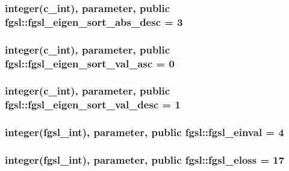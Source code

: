 \subsubsection[{fgsl\+\_\+eigen\+\_\+sort\+\_\+abs\+\_\+desc}]{\setlength{\rightskip}{0pt plus 5cm}integer(c\+\_\+int), parameter, public fgsl\+::fgsl\+\_\+eigen\+\_\+sort\+\_\+abs\+\_\+desc = 3}\label{namespacefgsl_a0ed0d4f25aa5ae03cb6adfe004cf648e}
\hypertarget{namespacefgsl_ad37ba047f5c1bbd5e2621f94d81a5aa4}{}
\subsubsection[{fgsl\+\_\+eigen\+\_\+sort\+\_\+val\+\_\+asc}]{\setlength{\rightskip}{0pt plus 5cm}integer(c\+\_\+int), parameter, public fgsl\+::fgsl\+\_\+eigen\+\_\+sort\+\_\+val\+\_\+asc = 0}\label{namespacefgsl_ad37ba047f5c1bbd5e2621f94d81a5aa4}
\hypertarget{namespacefgsl_a2dac34cd764be6e7de1f57d061c7f5d2}{}
\subsubsection[{fgsl\+\_\+eigen\+\_\+sort\+\_\+val\+\_\+desc}]{\setlength{\rightskip}{0pt plus 5cm}integer(c\+\_\+int), parameter, public fgsl\+::fgsl\+\_\+eigen\+\_\+sort\+\_\+val\+\_\+desc = 1}\label{namespacefgsl_a2dac34cd764be6e7de1f57d061c7f5d2}
\hypertarget{namespacefgsl_a720540845b1b10b1af117475a2b5f2c7}{}
\subsubsection[{fgsl\+\_\+einval}]{\setlength{\rightskip}{0pt plus 5cm}integer({\bf fgsl\+\_\+int}), parameter, public fgsl\+::fgsl\+\_\+einval = 4}\label{namespacefgsl_a720540845b1b10b1af117475a2b5f2c7}
\hypertarget{namespacefgsl_afdf53f6a99fb8880de40cd8136bf8e1c}{}
\subsubsection[{fgsl\+\_\+eloss}]{\setlength{\rightskip}{0pt plus 5cm}integer({\bf fgsl\+\_\+int}), parameter, public fgsl\+::fgsl\+\_\+eloss = 17}\label{namespacefgsl_afdf53f6a99fb8880de40cd8136bf8e1c}
\hypertarget{namespacefgsl_a5e63249fa198903f233261cb159a3e28}{}
